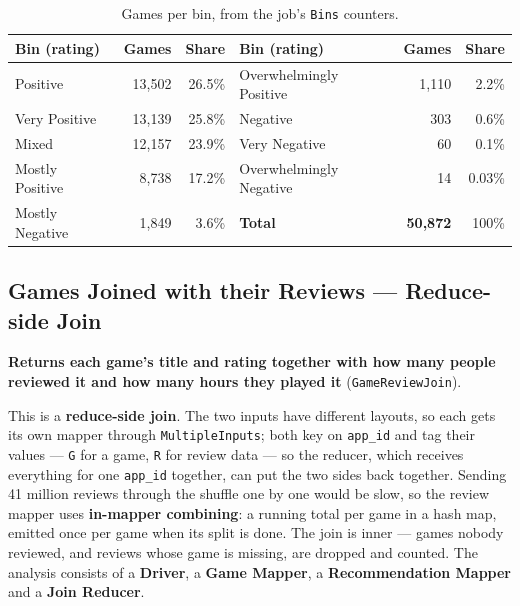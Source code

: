 \documentclass[11pt,a4paper]{article}
\newcommand{\code}[1]{\texttt{#1}}
\begin{document}
\begin{table}[H]\centering\footnotesize
\begin{tabular}{lrr@{\hspace{2.2em}}lrr}
\toprule
Bin (rating) & Games & Share & Bin (rating) & Games & Share \\
\midrule
Positive        & 13,502 & 26.5\% & Overwhelmingly Positive & 1,110 & 2.2\% \\
Very Positive   & 13,139 & 25.8\% & Negative                &   303 & 0.6\% \\
Mixed           & 12,157 & 23.9\% & Very Negative           &    60 & 0.1\% \\
Mostly Positive &  8,738 & 17.2\% & Overwhelmingly Negative &    14 & 0.03\% \\
Mostly Negative &  1,849 &  3.6\% & \textbf{Total}          & \textbf{50,872} & 100\% \\
\bottomrule
\end{tabular}
\caption{Games per bin, from the job's \code{Bins} counters.}
\end{table}

\subsection{Games Joined with their Reviews — Reduce-side Join}
\textbf{Returns each game's title and rating together with how many people reviewed it and how many
hours they played it} (\code{GameReviewJoin}).

This is a \textbf{reduce-side join}. The two inputs have different layouts, so each gets its own mapper
through \code{MultipleInputs}; both key on \code{app\_id} and tag their values — \code{G} for a game,
\code{R} for review data — so the reducer, which receives everything for one \code{app\_id} together,
can put the two sides back together. Sending 41 million reviews through the shuffle one by one would
be slow, so the review mapper uses \textbf{in-mapper combining}: a running total per game in a hash map,
emitted once per game when its split is done. The join is inner — games nobody reviewed, and reviews
whose game is missing, are dropped and counted. The analysis consists of a \textbf{Driver}, a
\textbf{Game Mapper}, a \textbf{Recommendation Mapper} and a \textbf{Join Reducer}.
\end{document}
